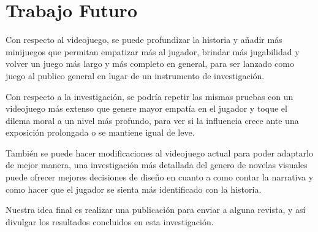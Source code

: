 \section{Trabajo Futuro}

Con respecto al videojuego, se puede profundizar la historia y añadir más minijuegos que permitan empatizar más al jugador, brindar más jugabilidad y volver un juego más largo y más completo en general, para ser lanzado como juego al publico general en lugar de un instrumento de investigación.

Con respecto a la investigación, se podría repetir las mismas pruebas con un videojuego más extenso que genere mayor empatía en el jugador y toque el dilema moral a un nivel más profundo, para ver si la influencia crece ante una exposición prolongada o se mantiene igual de leve.

También se puede hacer modificaciones al videojuego actual para poder adaptarlo de mejor manera, una investigación más detallada del genero de novelas visuales puede ofrecer mejores decisiones de diseño en cuanto a como contar la narrativa y como hacer que el jugador se sienta más identificado con la historia.

Nuestra idea final es realizar una publicación para enviar a alguna revista, y así divulgar los resultados concluidos en esta investigación.

